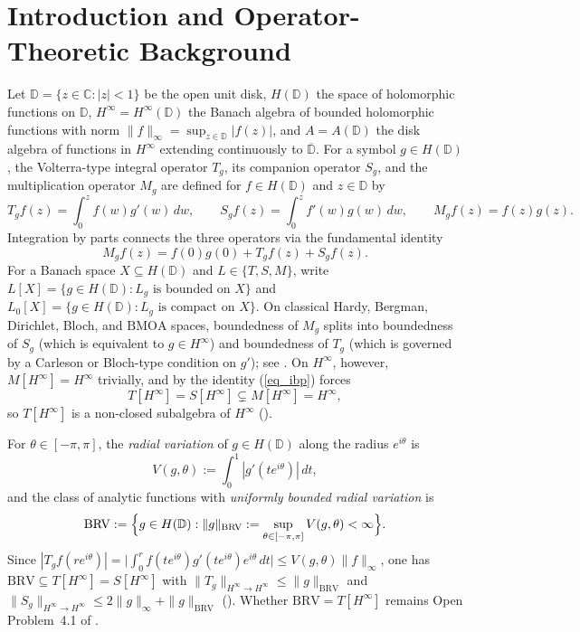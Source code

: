 \documentclass[11pt,reqno]{amsart}
\numberwithin{equation}{section}
\newcommand{\D}{\mathbb{D}}
\newcommand{\C}{\mathbb{C}}
\newcommand{\BRV}{\mathrm{BRV}}
\begin{document}
\section{Introduction and Operator-Theoretic Background}

Let $\D = \{z \in \C : |z| < 1\}$ be the open unit disk, $H(\D)$ the space of holomorphic functions on $\D$, $H^\infty = H^\infty(\D)$ the Banach algebra of bounded holomorphic functions with norm $\|f\|_\infty = \sup_{z \in \D} |f(z)|$, and $A = A(\D)$ the disk algebra of functions in $H^\infty$ extending continuously to $\overline{\D}$. For a symbol $g \in H(\D)$, the Volterra-type integral operator $T_g$, its companion operator $S_g$, and the multiplication operator $M_g$ are defined for $f \in H(\D)$ and $z \in \D$ by
\begin{equation} \label{eq_operators}
  T_g f(z) = \int_0^z f(w) g'(w)\,dw, \qquad
  S_g f(z) = \int_0^z f'(w) g(w)\,dw, \qquad
  M_g f(z) = f(z) g(z).
\end{equation}
Integration by parts connects the three operators via the fundamental identity \cite[Eq.~(1.1)]{AJS14}
\begin{equation} \label{eq_ibp}
  M_g f(z) = f(0) g(0) + T_g f(z) + S_g f(z).
\end{equation}
For a Banach space $X \subseteq H(\D)$ and $L \in \{T, S, M\}$, write $L[X] = \{g \in H(\D) : L_g \text{ is bounded on } X\}$ and $L_0[X] = \{g \in H(\D) : L_g \text{ is compact on } X\}$. On classical Hardy, Bergman, Dirichlet, Bloch, and $\mathrm{BMOA}$ spaces, boundedness of $M_g$ splits into boundedness of $S_g$ (which is equivalent to $g \in H^\infty$) and boundedness of $T_g$ (which is governed by a Carleson or Bloch-type condition on $g'$); see \cite{AC01, AS95, AS97, And10, Pom77, SZ99}. On $H^\infty$, however, $M[H^\infty] = H^\infty$ trivially, and by \cite[Proposition~2.3]{AJS14} the identity (\ref{eq_ibp}) forces
\begin{equation} \label{eq_TH_SH}
  T[H^\infty] = S[H^\infty] \subsetneq M[H^\infty] = H^\infty,
\end{equation}
so $T[H^\infty]$ is a non-closed subalgebra of $H^\infty$ (\cite[Corollary~2.15]{AJS14}).

For $\theta \in [-\pi, \pi]$, the \emph{radial variation} of $g \in H(\D)$ along the radius $e^{i\theta}$ is
\begin{equation} \label{eq_radial_var}
  V(g, \theta) := \int_0^1 |g'(t e^{i\theta})|\,dt,
\end{equation}
and the class of analytic functions with \emph{uniformly bounded radial variation} is
\begin{equation} \label{eq_BRV_def}
  \BRV := \Bigl\{ g \in H(\D) : \|g\|_{\BRV} := \sup_{\theta \in [-\pi, \pi]} V(g, \theta) < \infty \Bigr\}.
\end{equation}
Since $|T_g f(r e^{i\theta})| = \bigl|\int_0^r f(t e^{i\theta}) g'(t e^{i\theta}) e^{i\theta}\,dt\bigr| \le V(g, \theta) \|f\|_\infty$, one has $\BRV \subseteq T[H^\infty] = S[H^\infty]$ with $\|T_g\|_{H^\infty \to H^\infty} \le \|g\|_{\BRV}$ and $\|S_g\|_{H^\infty \to H^\infty} \le 2\|g\|_\infty + \|g\|_{\BRV}$ (\cite[Proposition~2.4]{AJS14}). Whether $\BRV = T[H^\infty]$ remains Open Problem~4.1 of \cite{AJS14}.
\end{document}

